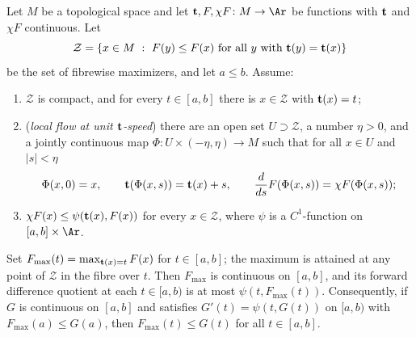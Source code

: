 \begin{lemma}
\label{lem:forward-difference-maximum-flow}
\leanok
{}
Let $M$ be a topological space and let
${\bf t},F,\chi F\colon M\to\Ar$ be functions with ${\bf t}$ and
$\chi F$ continuous. Let
$${\mathcal Z}=\left\{x\in M\ :\ F(y)\le F(x)\ \text{for all}\ y\
\text{with}\ {\bf t}(y)={\bf t}(x)\right\}$$
be the set of fibrewise maximizers, and let $a\le b$. Assume:
\begin{enumerate}
\item ${\mathcal Z}$ is compact, and for every $t\in[a,b]$ there is
$x\in{\mathcal Z}$ with ${\bf t}(x)=t$;
\item (\emph{local flow at unit ${\bf t}$-speed}) there are an open set
$U\supset{\mathcal Z}$, a number $\eta>0$, and a jointly continuous map
$\Phi\colon U\times(-\eta,\eta)\to M$ such that for all $x\in U$ and
$|s|<\eta$
$$\Phi(x,0)=x,\qquad {\bf t}(\Phi(x,s))={\bf t}(x)+s,\qquad
\frac{d}{ds}F(\Phi(x,s))=\chi F(\Phi(x,s));$$
\item $\chi F(x)\le\psi({\bf t}(x),F(x))$ for every $x\in{\mathcal Z}$,
where $\psi$ is a $C^1$-function on $[a,b]\times\Ar$.
\end{enumerate}
Set $F_{\mathrm{max}}(t)=\max_{{\bf t}(x)=t}F(x)$ for $t\in[a,b]$; the
maximum is attained at any point of ${\mathcal Z}$ in the fibre over
$t$. Then $F_{\mathrm{max}}$ is continuous on $[a,b]$, and its forward
difference quotient at each $t\in[a,b)$ is at most
$\psi(t,F_{\mathrm{max}}(t))$. Consequently, if $G$ is continuous on
$[a,b]$ and satisfies $G'(t)=\psi(t,G(t))$ on $[a,b)$ with
$F_{\mathrm{max}}(a)\le G(a)$, then $F_{\mathrm{max}}(t)\le G(t)$ for
all $t\in[a,b]$.
\end{lemma}

